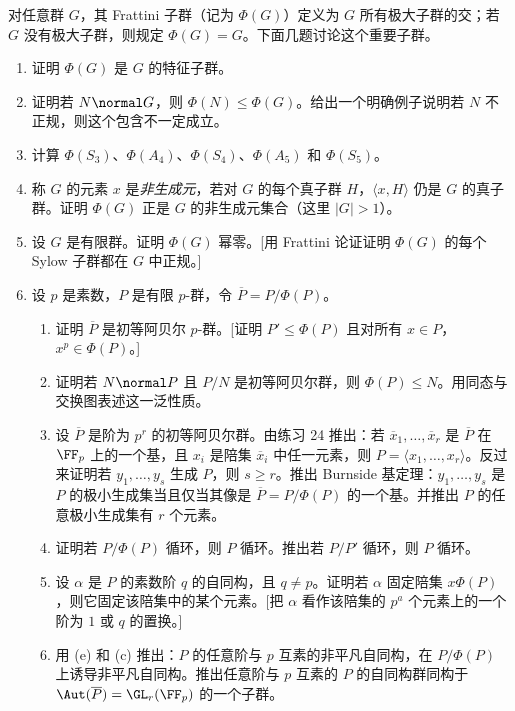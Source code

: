 对任意群 $G$，其 Frattini 子群（记为 $\Phi(G)$）定义为 $G$ 所有极大子群的交；若 $G$ 没有极大子群，则规定 $\Phi(G)=G$。下面几题讨论这个重要子群。

\begin{enumerate}[label=\arabic*.,resume]
  \item 证明 $\Phi(G)$ 是 $G$ 的特征子群。
  \item 证明若 $N\normal G$，则 $\Phi(N)\leq \Phi(G)$。给出一个明确例子说明若 $N$ 不正规，则这个包含不一定成立。
  \item 计算 $\Phi(S_3)$、$\Phi(A_4)$、$\Phi(S_4)$、$\Phi(A_5)$ 和 $\Phi(S_5)$。
  \item 称 $G$ 的元素 $x$ 是\emph{非生成元}，若对 $G$ 的每个真子群 $H$，$\langle x,H\rangle$ 仍是 $G$ 的真子群。证明 $\Phi(G)$ 正是 $G$ 的非生成元集合（这里 $|G|>1$）。
  \item 设 $G$ 是有限群。证明 $\Phi(G)$ 幂零。[用 Frattini 论证证明 $\Phi(G)$ 的每个 Sylow 子群都在 $G$ 中正规。]
  \item 设 $p$ 是素数，$P$ 是有限 $p$-群，令 $\overline P=P/\Phi(P)$。
  \begin{enumerate}[label=(\alph*)]
    \item 证明 $\overline P$ 是初等阿贝尔 $p$-群。[证明 $P'\leq \Phi(P)$ 且对所有 $x\in P$，$x^p\in\Phi(P)$。]
    \item 证明若 $N\normal P$ 且 $P/N$ 是初等阿贝尔群，则 $\Phi(P)\leq N$。用同态与交换图表述这一泛性质。
    \item 设 $\overline P$ 是阶为 $p^r$ 的初等阿贝尔群。由练习 24 推出：若 $\overline x_1,\ldots,\overline x_r$ 是 $\overline P$ 在 $\FF_p$ 上的一个基，且 $x_i$ 是陪集 $\overline x_i$ 中任一元素，则 $P=\langle x_1,
\ldots,x_r\rangle$。反过来证明若 $y_1,\ldots,y_s$ 生成 $P$，则 $s\geq r$。推出 Burnside 基定理：$y_1,
\ldots,y_s$ 是 $P$ 的极小生成集当且仅当其像是 $\overline P=P/\Phi(P)$ 的一个基。并推出 $P$ 的任意极小生成集有 $r$ 个元素。
    \item 证明若 $P/\Phi(P)$ 循环，则 $P$ 循环。推出若 $P/P'$ 循环，则 $P$ 循环。
    \item 设 $\alpha$ 是 $P$ 的素数阶 $q$ 的自同构，且 $q\neq p$。证明若 $\alpha$ 固定陪集 $x\Phi(P)$，则它固定该陪集中的某个元素。[把 $\alpha$ 看作该陪集的 $p^a$ 个元素上的一个阶为 $1$ 或 $q$ 的置换。]
    \item 用 (e) 和 (c) 推出：$P$ 的任意阶与 $p$ 互素的非平凡自同构，在 $P/\Phi(P)$ 上诱导非平凡自同构。推出任意阶与 $p$ 互素的 $P$ 的自同构群同构于 $\Aut(\overline P)=\GL_r(\FF_p)$ 的一个子群。
  \end{enumerate}

\end{enumerate}
